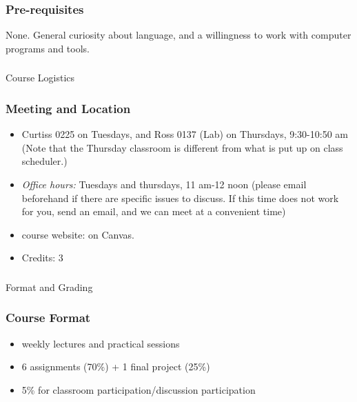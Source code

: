 \documentclass{beamer}
\begin{document}
\begin{frame}
\frametitle{Pre-requisites}
None. General curiosity about language, and a willingness to work with computer programs and tools.
\end{frame}

\begin{frame}
\frametitle{}
\begin{center}
\Large Course Logistics
\end{center}
\end{frame}

\begin{frame}
\frametitle{Meeting and Location}
\begin{itemize}
\item  Curtiss 0225 on Tuesdays, and Ross 0137 (Lab) on Thursdays, 9:30-10:50 am
\\ (Note that the Thursday classroom is different from what is put up on class scheduler.)
\item \textit{Office hours:} Tuesdays and thursdays, 11 am-12 noon (please email beforehand if there are specific issues to discuss. If this time does not work for you, send an email, and we can meet at a convenient time)
\item course website: on Canvas.
\item Credits: 3 
\end{itemize}
\end{frame}

\begin{frame}
\frametitle{}
\begin{center}
Format and Grading
\end{center}
\end{frame}

\begin{frame}
\frametitle{Course Format}
\begin{itemize}\itemsep2ex
\item weekly lectures and practical sessions
\item 6 assignments (70\%) + 1 final project (25\%)
\item 5\% for classroom participation/discussion participation
\end{itemize}
\end{frame}
\end{document}
